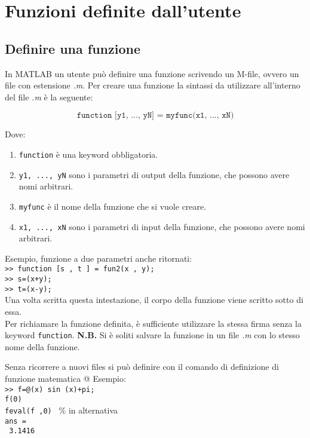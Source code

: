\chapter{Funzioni definite dall'utente}
\section{Definire una funzione}
In MATLAB un utente può definire una funzione scrivendo un M-file, ovvero un file con estensione \textit{.m}.
Per creare una funzione la sintassi da utilizzare all'interno del file \textit{.m} è la seguente:

$$  \texttt{function [y1, ..., yN] = myfunc(x1, ..., xN)}$$

Dove:
\begin{enumerate}
	\item	\texttt{function} è una keyword obbligatoria.
	\item	\texttt{y1, ..., yN} sono i parametri di output della funzione, che possono avere nomi arbitrari.
	\item 	\texttt{myfunc} è il nome della funzione che si vuole creare.
	\item	\texttt{x1, ..., xN} sono i parametri di input della funzione, che possono avere nomi arbitrari. 
\end{enumerate}

Esempio, funzione a due parametri anche ritornati:\\

\texttt{>> function [s , t ] = fun2(x , y);} \\
\texttt{>> s=(x+y);} \\
\texttt{>> t=(x-y);} \\ 

Una volta scritta questa intestazione, il corpo della funzione viene scritto sotto di essa. \\
Per richiamare la funzione definita, è sufficiente utilizzare la stessa firma senza la keyword \texttt{function}. 
\break \break
\textbf{N.B.} Si è soliti salvare la funzione in un file \textit{.m} con lo stesso nome della funzione. 

Senza ricorrere a nuovi files si può definire con il comando di definizione di funzione matematica @
Esempio: \\
\texttt{>> f=@(x) sin (x)+pi;} \\
\texttt{f(0) } \\
\texttt{feval(f ,0) } \% in alternativa \\
\texttt{ans = } \\
\texttt{\hspace{0.5cm} 3.1416} \break